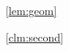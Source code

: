\documentclass{llncs}
\renewcommand{\S}{\mathcal{S}}
\newcommand{\Y}{\mathcal{Y}}
\renewcommand{\B}{\mathcal{B}}
\newcommand{\CH}[1]{\normalfont{\mathbf{conv}\of{#1}}}
\renewcommand{\v}{\myvec{v}}
\renewcommand{\u}{\myvec{u}}
\renewcommand{\c}{\myvec{c}}
\newcommand{\errvec}{\myvec{err}}
\newcommand{\norm}[2]{\left|\left|#1\right|\right|_{#2}}
\begin{document}
\begin{proofof}{\cref{lem:geom}}
\begin{proofof}{\cref{clm:second}}
\end{proofof}
\end{proofof}
\end{document}
